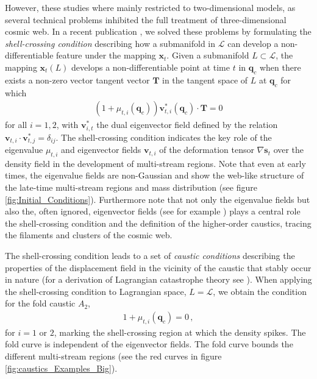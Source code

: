 \documentclass[a4paper, 11pt]{article}
\begin{document}
However, these studies where mainly restricted to two-dimensional models, as several technical problems inhibited the full treatment of three-dimensional cosmic web. In a recent publication \cite{Feldbrugge:2018}, we solved these problems by formulating the \textit{shell-crossing condition} describing how a submanifold in $\mathcal{L}$ can develop a non-differentiable feature under the mapping $\bm{x}_t$. Given a submanifold $L \subset \mathcal{L}$, the mapping $\bm{x}_t(L)$ develops a non-differentiable point at time $t$ in $\bm{q}_c$ when there exists a non-zero vector tangent vector $\bm{T}$ in the tangent space of $L$ at $\bm{q}_c$ for which 
\begin{align}
(1+\mu_{t,i}(\bm{q}_c))\bm{v}_{t,i}^*(\bm{q}_c) \cdot \bm{T}=0
\label{eq:shellCrossingCondition}
\end{align}
for all $i=1,2$, with $\bm{v}_{i,t}^*$ the dual eigenvector field defined by the relation $\bm{v}_{t,i}\cdot \bm{v}_{t,j}^* = \delta_{ij}$. The shell-crossing condition indicates the key role of the eigenvalue $\mu_{t,i}$ and eigenvector fields $\bm{v}_{t,i}$ of the deformation tensor $\nabla \bm{s}_t$ over the density field in the development of multi-stream regions. Note that even at early times, the eigenvalue fields are non-Gaussian and show the web-like structure of the late-time multi-stream regions and mass distribution (see figure \ref{fig:Initial_Conditions}). Furthermore note that not only the eigenvalue fields but also the, often ignored, eigenvector fields (see for example \cite{Forero:2009}) plays a central role the shell-crossing condition and the definition of the higher-order caustics, tracing the filaments and clusters of the cosmic web.

The shell-crossing condition leads to a set of \textit{caustic conditions} describing the properties of the displacement field in the vicinity of the caustic that stably occur in nature (for a derivation of Lagrangian catastrophe theory see \cite{Arnold:1972, Arnold:1976, Poston:1978, Gilmore:1981, Kravtsov:1983, Arnold:1984, Arnold:2012a, Arnold:2012b}). When applying the shell-crossing condition to Lagrangian space, $L=\mathcal{L}$, we obtain the condition for the fold caustic $A_2$,
\begin{align}
1+\mu_{t,i}(\bm{q}_c)=0\,,
\end{align}
for $i=1$ or $2$, marking the shell-crossing region at which the density spikes. The fold curve is independent of the eigenvector fields. The fold curve bounds the different multi-stream regions (see the red curves in figure \ref{fig:caustics_Examples_Big}).
\end{document}
